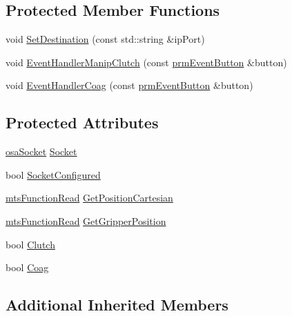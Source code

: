 \subsection*{Protected Member Functions}
\begin{DoxyCompactItemize}
\item 
void \hyperlink{classmts_intuitive_research_kit_u_d_p_streamer_ac11b0edd8b3f250ee7b358c978734507}{Set\-Destination} (const std\-::string \&ip\-Port)
\item 
void \hyperlink{classmts_intuitive_research_kit_u_d_p_streamer_ae60d9df5e7ce18b822ad984d32d93ce2}{Event\-Handler\-Manip\-Clutch} (const \hyperlink{classprm_event_button}{prm\-Event\-Button} \&button)
\item 
void \hyperlink{classmts_intuitive_research_kit_u_d_p_streamer_a03fe4535626a212fd2baf79ddd9ac01d}{Event\-Handler\-Coag} (const \hyperlink{classprm_event_button}{prm\-Event\-Button} \&button)
\end{DoxyCompactItemize}
\subsection*{Protected Attributes}
\begin{DoxyCompactItemize}
\item 
\hyperlink{classosa_socket}{osa\-Socket} \hyperlink{classmts_intuitive_research_kit_u_d_p_streamer_a0b479c1e42ce285852d0fef70f3e0597}{Socket}
\item 
bool \hyperlink{classmts_intuitive_research_kit_u_d_p_streamer_ac662f1d0ff67561e6f38d88d39f4e139}{Socket\-Configured}
\item 
\hyperlink{classmts_function_read}{mts\-Function\-Read} \hyperlink{classmts_intuitive_research_kit_u_d_p_streamer_aeb53097fbe58b91a3e2ce02356ae673f}{Get\-Position\-Cartesian}
\item 
\hyperlink{classmts_function_read}{mts\-Function\-Read} \hyperlink{classmts_intuitive_research_kit_u_d_p_streamer_abc017168d11749a876eca0ecd6c86a3e}{Get\-Gripper\-Position}
\item 
bool \hyperlink{classmts_intuitive_research_kit_u_d_p_streamer_ade3b681c621a17c3f5d3ac71bab295b1}{Clutch}
\item 
bool \hyperlink{classmts_intuitive_research_kit_u_d_p_streamer_a46783b066d84ec1969514899f3c4d8e8}{Coag}
\end{DoxyCompactItemize}
\subsection*{Additional Inherited Members}


